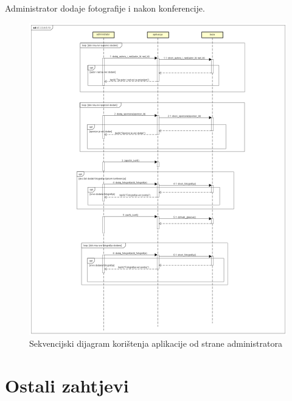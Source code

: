 				Administrator dodaje fotografije i nakon konferencije.

				\begin{figure}[H]
					\includegraphics[scale=0.3]{slike/sekv2.png}%
					\centering
					\caption{Sekvencijski dijagram korištenja aplikacije od strane administratora}
					\label{fig:promjene10}
				\end{figure}
				\eject
	
		\section{Ostali zahtjevi}
		
		 
